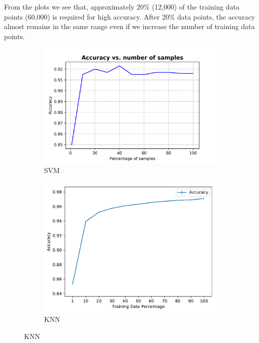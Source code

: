 \documentclass[10pt]{scrartcl}
\begin{document}
From the plots we see that, approximately 20\% (12,000) of the training data points (60,000) is required for high accuracy. After 20\% data points, the accuracy almost remains in the same range even if we increase the number of training data points.

\begin{figure}[H]
	\centering
	\begin{subfigure}{0.4\linewidth}
		\centering
		\includegraphics[width=1\linewidth]{figures/accuracy_vs_samples_svm_tuned.png}
		\caption{SVM}\label{fig:1a}		
	\end{subfigure}
	\begin{subfigure}{0.35\linewidth}
		\centering
		\includegraphics[width=1\linewidth]{figures/KNN_accuracy_vs_tss_with_fixed_k.pdf}
		\caption{KNN}\label{fig:1b}
	\end{subfigure}

\end{figure}
\end{document}
